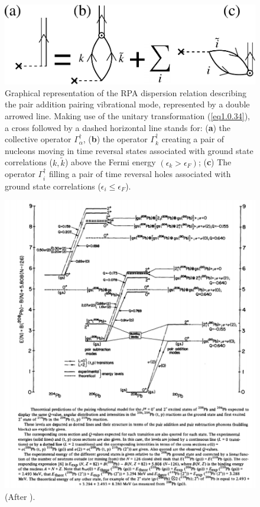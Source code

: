 \documentclass[a4paper,11pt]{book}
\numberwithin{equation}{section}
\numberwithin{figure}{section}
\numberwithin{table}{section}
\begin{document}
\begin{figure}
	\centerline {
		\includegraphics*[width=12cm]{introduccion/figs/fig_preface_3_1}
	}
	\caption{Graphical representation of the RPA dispersion relation describing the pair addition pairing vibrational mode, represented by a double arrowed line. Making use of the unitary transformation (\ref{eq1.0.34}), a cross followed by a dashed horizontal line stands for: (\textbf{a}) the collective operator $\Gamma_\alpha^\dagger$, (\textbf{b}) the operator $\Gamma_k^\dagger$ creating a pair of nucleons moving in time reversal states associated with ground state correlations ($k,\tilde k$) above the Fermi energy $(\epsilon_k>\epsilon_F)$; (\textbf{c}) The operator $\Gamma^\dagger_i$ filling a pair of time reversal holes associated with ground state correlations ($\epsilon_i\leq\epsilon_F$).}
	\label{fig0.3.1}
\end{figure}
\begin{figure}
	\centerline {
		\includegraphics*[width=18cm, angle=0.]{introduccion/figs/fig0_3_2_v2}
	}
	\caption{(After \cite{Flynn:72}).}
	\label{fig0.3.2}
\end{figure}
\end{document}
